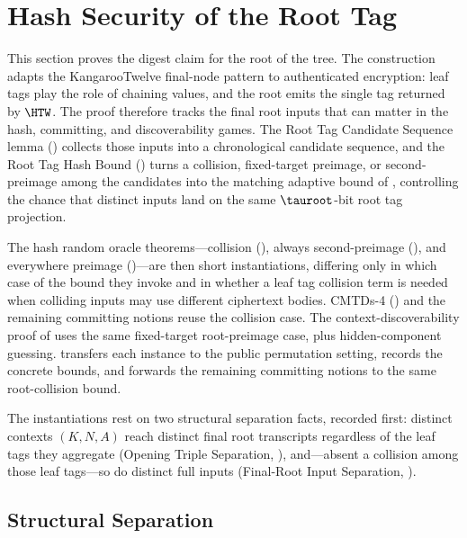 \section{Hash Security of the Root Tag}
\label{sec:cmtds3}
\label{sec:root-tag-hash-security}

This section proves the digest claim for the root of the \TW{} tree. The
construction adapts the KangarooTwelve final-node pattern to authenticated
encryption: leaf tags play the role of chaining values, and the root emits the
single tag returned by $\HTW$. The proof therefore tracks the final root inputs
that can matter in the hash, committing, and discoverability games. The Root Tag
Candidate Sequence lemma () collects those inputs
into a chronological candidate sequence, and the Root Tag Hash Bound
() turns a collision, fixed-target preimage, or
second-preimage among the candidates into the matching adaptive bound of
, controlling the chance that distinct inputs land on the same
$\tauroot$-bit root tag projection.

The hash random oracle theorems---collision (), always
second-preimage (), and everywhere preimage
()---are then short instantiations, differing only in which
case of the bound they invoke and in whether a leaf tag collision term is needed
when colliding inputs may use different ciphertext bodies. CMTDs-4
() and the remaining committing notions reuse the collision
case. The context-discoverability proof of  uses the same
fixed-target root-preimage case, plus hidden-component guessing.
 transfers each instance to the public
permutation setting,  records the concrete bounds, and
 forwards the remaining \cite{BH22}
committing notions to the same root-collision bound.

The instantiations rest on two structural separation facts, recorded
first: distinct contexts $(K, N, A)$ reach distinct final root
transcripts regardless of the leaf tags they aggregate (Opening Triple
Separation, ), and---absent a collision among those
leaf tags---so do distinct full inputs (Final-Root Input Separation,
).

\subsection{Structural Separation}


